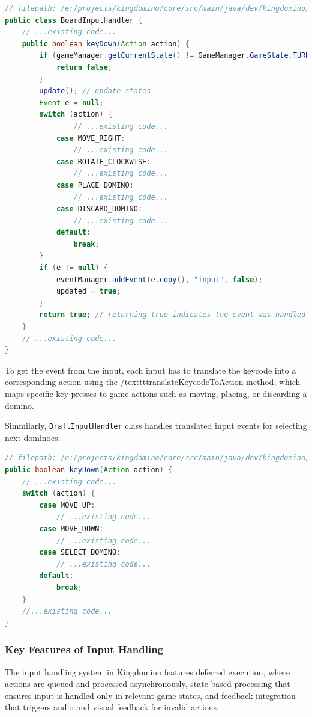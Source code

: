 \documentclass[conference]{IEEEtran}
\begin{document}
\begin{lstlisting}[language=Java]
// filepath: /e:/projects/kingdomino/core/src/main/java/dev/kingdomino/game/BoardInputHandler.java
public class BoardInputHandler {
    // ...existing code...
    public boolean keyDown(Action action) {
        if (gameManager.getCurrentState() != GameManager.GameState.TURN_PLACING) {
            return false;
        }
        update(); // update states
        Event e = null;
        switch (action) {
                // ...existing code...
            case MOVE_RIGHT:
                // ...existing code...
            case ROTATE_CLOCKWISE:
                // ...existing code...
            case PLACE_DOMINO:
                // ...existing code...
            case DISCARD_DOMINO:
                // ...existing code...
            default:
                break;
        }
        if (e != null) {
            eventManager.addEvent(e.copy(), "input", false);
            updated = true;
        }
        return true; // returning true indicates the event was handled
    }
    // ...existing code...
}
\end{lstlisting}

To get the event from the input, each input has to translate the keycode into a
corresponding action using the /texttt{translateKeycodeToAction} method, which
maps specific key presses to game actions such as moving, placing, or
discarding a domino.

Simmilarly, \texttt{DraftInputHandler} class handles translated input events
for selecting next dominoes.

\begin{lstlisting}[language=Java]
// filepath: /e:/projects/kingdomino/core/src/main/java/dev/kingdomino/game/DraftInputHandler.java
public boolean keyDown(Action action) {
    // ...existing code...
    switch (action) {
        case MOVE_UP:
            // ...existing code...
        case MOVE_DOWN:
            // ...existing code...
        case SELECT_DOMINO:
            // ...existing code...
        default:
            break;
    }
    //...existing code...
}
\end{lstlisting}

\subsubsection{Key Features of Input Handling}
The input handling system in Kingdomino features deferred execution, where
actions are queued and processed asynchronously, state-based processing that
ensures input is handled only in relevant game states, and feedback integration
that triggers audio and visual feedback for invalid actions.
\end{document}

